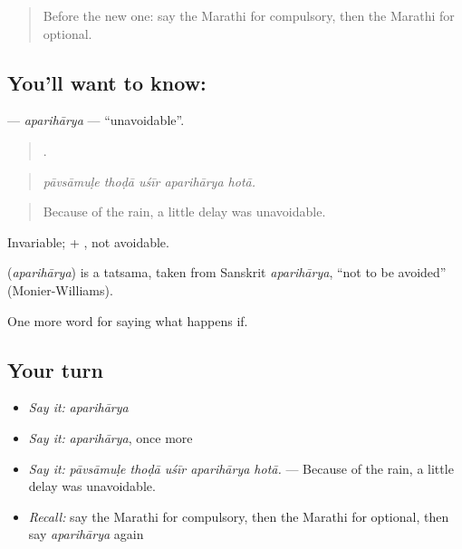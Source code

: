 \label{lesson:MR-C380-apariharya}



\begin{quote}
Before the new one: say the Marathi for compulsory, then the Marathi for optional.
\end{quote}

\subsection*{You'll want to know: }
\textbf{} — \emph{aparihārya} — \textquotedblleft{}unavoidable\textquotedblright{}.

\begin{quote}
    .
\end{quote}

\begin{quote}
\emph{pāvsāmuḷe thoḍā uśīr aparihārya hotā.}
\end{quote}

\begin{quote}
Because of the rain, a little delay was unavoidable.
\end{quote}

Invariable;  + , not avoidable.

\begin{cousinweb}
\textbf{} (\emph{aparihārya}) is a tatsama, taken from Sanskrit \emph{aparihārya}, \textquotedblleft{}not to be avoided\textquotedblright{} (Monier-Williams).
\end{cousinweb}

\begin{grammarlens}[title={What you've built}]
One more word for saying what happens if.
\end{grammarlens}

\subsection*{Your turn}
\begin{itemize}
\raggedright
  \item \emph{Say it:} \emph{aparihārya}
  \item \emph{Say it:} \emph{aparihārya}, once more
  \item \emph{Say it:} \emph{pāvsāmuḷe thoḍā uśīr aparihārya hotā.} — Because of the rain, a little delay was unavoidable.
  \item \emph{Recall:} say the Marathi for compulsory, then the Marathi for optional, then say \emph{aparihārya} again
\end{itemize}

